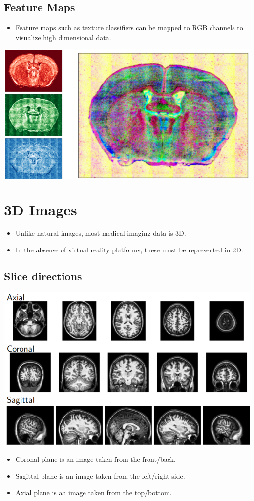 \documentclass[10pt]{article}
\begin{document}
\subsection*{Feature Maps}
\begin{itemize}
    \item Feature maps such as texture classifiers can be mapped to RGB channels to visualize high dimensional data.
\end{itemize}
\begin{center}
    \includegraphics*[width=\textwidth]{W1_11.png}
\end{center}
\section*{3D Images}
\begin{itemize}
    \item Unlike natural images, most medical imaging data is 3D.
    \item In the absense of virtual reality platforms, these must be represented in 2D.
\end{itemize}
\subsection*{Slice directions}
\begin{center}
    \includegraphics*[width=\textwidth]{W1_12.png}
\end{center}
\begin{itemize}
    \item Coronal plane is an image taken from the front/back.
    \item Sagittal plane is an image taken from the left/right side.
    \item Axial plane is an image taken from the top/bottom.
\end{itemize}
\end{document}
